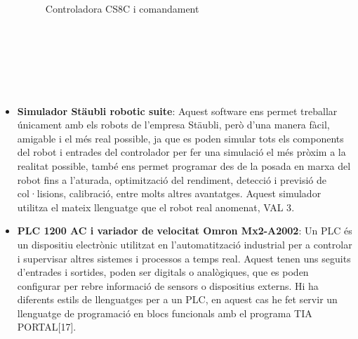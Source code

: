 ﻿\documentclass[10pt,a4paper,twocolumn,twoside]{article}
\begin{document}
\begin{itemize}
\begin{figure}[h]
 \centering
 \caption{Controladora CS8C i comandament}
 \label{f:tx60}
\end{figure}
\hfill \break
\hfill \break
\\
\\
\\
\\
\\
  \item\textbf{Simulador Stäubli robotic suite}: Aquest software ens permet treballar únicament amb els robots de l'empresa Stäubli, però d'una manera fàcil, amigable i el més real possible, ja que es poden simular tots els components del robot i entrades del controlador per fer una simulació el més pròxim a la realitat possible, també ens permet programar des de la posada en marxa del robot fins a l'aturada, optimització del rendiment, detecció i previsió de col·lisions, calibració, entre molts altres avantatges. Aquest simulador utilitza el mateix llenguatge que el robot real anomenat, VAL 3\cite{val3}.

  \item\textbf{PLC 1200 AC i variador de velocitat Omron Mx2-A2002}: Un PLC és un dispositiu electrònic utilitzat en l'automatització industrial per a controlar i supervisar altres sistemes i processos a temps real. Aquest tenen uns seguits d'entrades i sortides, poden ser digitals o analògiques, que es poden configurar per rebre informació de sensors o dispositius externs. Hi ha diferents estils de llenguatges per a un PLC, en aquest cas he fet servir un llenguatge de programació en blocs funcionals amb el programa  TIA PORTAL[17].
\\


\end{itemize}
\end{document}
